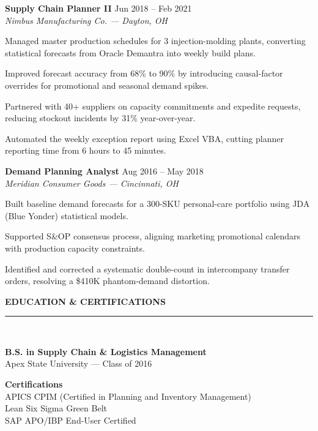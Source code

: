 \documentclass[10pt]{article}
\newcommand{\sectiontitle}[1]{%
  \vspace{2pt}
  {\color{navy}\fontsize{11.5}{13}\selectfont\bfseries #1}\\[-5pt]
  {\color{accent}\rule{\linewidth}{1.1pt}}\\[1pt]
}
\newcommand{\jobheader}[3]{%
  \textbf{\color{navy}\fontsize{10}{11}\selectfont #1} \hfill {\color{graytext}\small #3}\\{}
  \textit{\color{accent}\small #2}\\[0pt]
}
\begin{document}
\vspace{1pt}
\jobheader{Supply Chain Planner II}{Nimbus Manufacturing Co. --- Dayton, OH}{Jun 2018 -- Feb 2021}
\begin{achieve}
  \item Managed master production schedules for 3 injection-molding plants, converting statistical forecasts from Oracle Demantra into weekly build plans.
  \item Improved forecast accuracy from 68\% to 90\% by introducing causal-factor overrides for promotional and seasonal demand spikes.
  \item Partnered with 40+ suppliers on capacity commitments and expedite requests, reducing stockout incidents by 31\% year-over-year.
  \item Automated the weekly exception report using Excel VBA, cutting planner reporting time from 6 hours to 45 minutes.
\end{achieve}

\vspace{1pt}
\jobheader{Demand Planning Analyst}{Meridian Consumer Goods --- Cincinnati, OH}{Aug 2016 -- May 2018}
\begin{achieve}
  \item Built baseline demand forecasts for a 300-SKU personal-care portfolio using JDA (Blue Yonder) statistical models.
  \item Supported S\&OP consensus process, aligning marketing promotional calendars with production capacity constraints.
  \item Identified and corrected a systematic double-count in intercompany transfer orders, resolving a \$410K phantom-demand distortion.
\end{achieve}

\sectiontitle{EDUCATION \& CERTIFICATIONS}
\begin{minipage}[t]{0.58\textwidth}
  \textbf{\color{navy}B.S. in Supply Chain \& Logistics Management}\\
  {\small\color{graytext} Apex State University --- Class of 2016}
\end{minipage}\hfill
\begin{minipage}[t]{0.38\textwidth}
  \small
  \textbf{\color{navy}Certifications}\\
  APICS CPIM (Certified in Planning and Inventory Management)\\
  Lean Six Sigma Green Belt\\
  SAP APO/IBP End-User Certified
\end{minipage}
\end{document}
